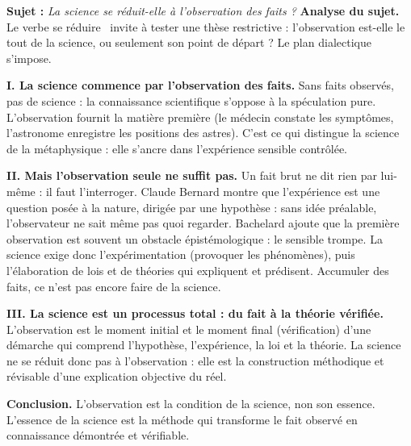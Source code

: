 \documentclass[11pt]{article}
\begin{document}
\begin{exoresolu}
\textbf{Sujet :} \emph{La science se réduit-elle à l'observation des faits ?}
\tcblower
\textbf{Analyse du sujet.} Le verbe \guillemotleft se réduire \guillemotright\ invite à tester une thèse restrictive : l'observation est-elle le tout de la science, ou seulement son point de départ ? Le plan dialectique s'impose.

\textbf{I. La science commence par l'observation des faits.}
Sans faits observés, pas de science : la connaissance scientifique s'oppose à la spéculation pure. L'observation fournit la matière première (le médecin constate les symptômes, l'astronome enregistre les positions des astres). C'est ce qui distingue la science de la métaphysique : elle s'ancre dans l'expérience sensible contrôlée.

\textbf{II. Mais l'observation seule ne suffit pas.}
Un fait brut ne dit rien par lui-même : il faut l'interroger. Claude Bernard montre que l'expérience est une question posée à la nature, dirigée par une hypothèse : sans idée préalable, l'observateur ne sait même pas quoi regarder. Bachelard ajoute que la première observation est souvent un obstacle épistémologique : le sensible trompe. La science exige donc l'expérimentation (provoquer les phénomènes), puis l'élaboration de lois et de théories qui expliquent et prédisent. Accumuler des faits, ce n'est pas encore faire de la science.

\textbf{III. La science est un processus total : du fait à la théorie vérifiée.}
L'observation est le moment initial et le moment final (vérification) d'une démarche qui comprend l'hypothèse, l'expérience, la loi et la théorie. La science ne se réduit donc pas à l'observation : elle est la construction méthodique et révisable d'une explication objective du réel.

\textbf{Conclusion.} L'observation est la condition de la science, non son essence. L'essence de la science est la méthode qui transforme le fait observé en connaissance démontrée et vérifiable.
\end{exoresolu}
\end{document}
